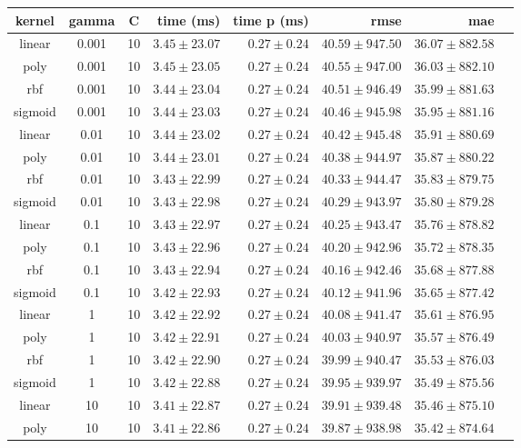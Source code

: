 \begin{tabular}{cccrrrrr}
\toprule
\textbf{kernel} & \textbf{gamma} & \textbf{C} & \textbf{time (ms)} & \textbf{time p (ms)} & \textbf{rmse} & \textbf{mae}\\
\midrule
linear & 0.001 & 10 & $3.45 \pm 23.07$ & $0.27 \pm 0.24$ & $40.59 \pm 947.50$ & $36.07 \pm 882.58$\\
poly & 0.001 & 10 & $3.45 \pm 23.05$ & $0.27 \pm 0.24$ & $40.55 \pm 947.00$ & $36.03 \pm 882.10$\\
rbf & 0.001 & 10 & $3.44 \pm 23.04$ & $0.27 \pm 0.24$ & $40.51 \pm 946.49$ & $35.99 \pm 881.63$\\
sigmoid & 0.001 & 10 & $3.44 \pm 23.03$ & $0.27 \pm 0.24$ & $40.46 \pm 945.98$ & $35.95 \pm 881.16$\\
linear & 0.01 & 10 & $3.44 \pm 23.02$ & $0.27 \pm 0.24$ & $40.42 \pm 945.48$ & $35.91 \pm 880.69$\\
poly & 0.01 & 10 & $3.44 \pm 23.01$ & $0.27 \pm 0.24$ & $40.38 \pm 944.97$ & $35.87 \pm 880.22$\\
rbf & 0.01 & 10 & $3.43 \pm 22.99$ & $0.27 \pm 0.24$ & $40.33 \pm 944.47$ & $35.83 \pm 879.75$\\
sigmoid & 0.01 & 10 & $3.43 \pm 22.98$ & $0.27 \pm 0.24$ & $40.29 \pm 943.97$ & $35.80 \pm 879.28$\\
linear & 0.1 & 10 & $3.43 \pm 22.97$ & $0.27 \pm 0.24$ & $40.25 \pm 943.47$ & $35.76 \pm 878.82$\\
poly & 0.1 & 10 & $3.43 \pm 22.96$ & $0.27 \pm 0.24$ & $40.20 \pm 942.96$ & $35.72 \pm 878.35$\\
rbf & 0.1 & 10 & $3.43 \pm 22.94$ & $0.27 \pm 0.24$ & $40.16 \pm 942.46$ & $35.68 \pm 877.88$\\
sigmoid & 0.1 & 10 & $3.42 \pm 22.93$ & $0.27 \pm 0.24$ & $40.12 \pm 941.96$ & $35.65 \pm 877.42$\\
linear & 1 & 10 & $3.42 \pm 22.92$ & $0.27 \pm 0.24$ & $40.08 \pm 941.47$ & $35.61 \pm 876.95$\\
poly & 1 & 10 & $3.42 \pm 22.91$ & $0.27 \pm 0.24$ & $40.03 \pm 940.97$ & $35.57 \pm 876.49$\\
rbf & 1 & 10 & $3.42 \pm 22.90$ & $0.27 \pm 0.24$ & $39.99 \pm 940.47$ & $35.53 \pm 876.03$\\
sigmoid & 1 & 10 & $3.42 \pm 22.88$ & $0.27 \pm 0.24$ & $39.95 \pm 939.97$ & $35.49 \pm 875.56$\\
linear & 10 & 10 & $3.41 \pm 22.87$ & $0.27 \pm 0.24$ & $39.91 \pm 939.48$ & $35.46 \pm 875.10$\\
poly & 10 & 10 & $3.41 \pm 22.86$ & $0.27 \pm 0.24$ & $39.87 \pm 938.98$ & $35.42 \pm 874.64$\\

\end{tabular}
